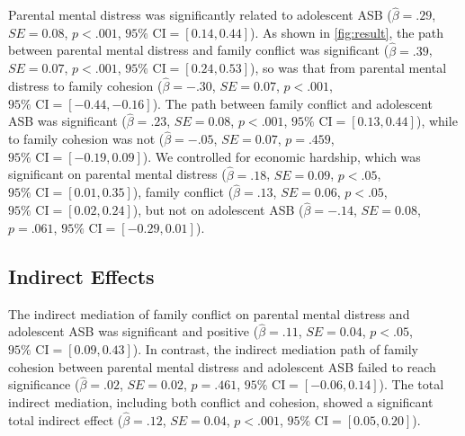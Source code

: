 \documentclass{sn-jnl}                  %
\begin{document}
Parental mental distress was significantly related to adolescent ASB ($\hat{\beta} = .29$, $SE = 0.08$, $p < .001$, $95\% \text{ CI} = [0.14, 0.44]$). As shown in \cref{fig:result}, the path between parental mental distress and family conflict was significant ($\hat{\beta} = .39$, $SE = 0.07$, $p < .001$, $95\% \text{ CI} = [0.24, 0.53]$), so was that from parental mental distress to family cohesion ($\hat{\beta} = -.30$, $SE = 0.07$, $p < .001$, $95\% \text{ CI} = [-0.44, -0.16]$). The path between family conflict and adolescent ASB was significant ($\hat{\beta} = .23$, $SE = 0.08$, $p < .001$, $95\% \text{ CI} = [0.13, 0.44]$), while to family cohesion was not ($\hat{\beta} = -.05$, $SE = 0.07$, $p = .459$, $95\% \text{ CI} = [-0.19, 0.09]$). We controlled for economic hardship, which was significant on parental mental distress ($\hat{\beta} = .18$, $SE = 0.09$, $p < .05$, $95\% \text{ CI} = [0.01, 0.35]$), family conflict ($\hat{\beta} = .13$, $SE = 0.06$, $p < .05$, $95\% \text{ CI} = [0.02, 0.24]$), but not on adolescent ASB ($\hat{\beta} = -.14$, $SE = 0.08$, $p = .061$, $95\% \text{ CI} = [-0.29, 0.01]$).

\subsection{Indirect Effects}

The indirect mediation of family conflict on parental mental distress and adolescent ASB was significant and positive ($\hat{\beta} = .11$, $SE = 0.04$, $p < .05$, $95\% \text{ CI} = [0.09, 0.43]$). In contrast, the indirect mediation path of family cohesion between parental mental distress and adolescent ASB failed to reach significance ($\hat{\beta} = .02$, $SE = 0.02$, $p = .461$, $95\% \text{ CI} = [-0.06, 0.14]$). The total indirect mediation, including both conflict and cohesion, showed a significant total indirect effect ($\hat{\beta} = .12$, $SE = 0.04$, $p < .001$, $95\% \text{ CI} = [0.05, 0.20]$).
\end{document}
